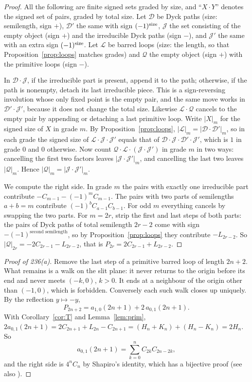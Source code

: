 \documentclass[11pt]{amsart}
\theoremstyle{definition}
\theoremstyle{remark}
\begin{document}
\begin{proof}
All the following are finite signed sets graded by size, and ``$X\cdot Y$'' denotes the signed set of pairs, graded by
total size. Let $\mathcal D$ be Dyck paths (size: semilength, sign $+$), $\mathcal D'$ the same with sign $(-1)^{\rm size}$,
$\mathcal J$ the set consisting of the empty object (sign $+$) and the irreducible Dyck paths (sign $-$), and $\mathcal J'$
the same with an extra sign $(-1)^{\rm size}$. Let $\mathcal L$ be barred loops (size: the length, so that Proposition~\ref{prop:loops} matches grades) and $\mathcal Q$
the empty object (sign $+$) with the primitive loops (sign $-$).

In $\mathcal D\cdot\mathcal J$, if the irreducible part is present, append it to the path; otherwise, if the path is
nonempty, detach its last irreducible piece. This is a sign-reversing involution whose only fixed point is the empty pair,
and the same move works in $\mathcal D'\cdot\mathcal J'$, because it does not change the total size. Likewise
$\mathcal L\cdot\mathcal Q$ cancels to the empty pair by appending or detaching a last primitive loop. Write $|X|_m$ for
the signed size of $X$ in grade $m$. By Proposition~\ref{prop:loops}, $|\mathcal L|_m=|\mathcal D\cdot\mathcal D'|_m$, so
in each grade the signed size of $\mathcal L\cdot\mathcal J\cdot\mathcal J'$ equals that of
$\mathcal D\cdot\mathcal J\cdot\mathcal D'\cdot\mathcal J'$, which is $1$ in grade $0$ and $0$ otherwise. Now count
$\mathcal Q\cdot\mathcal L\cdot(\mathcal J\cdot\mathcal J')$ in grade $m$ in two ways: cancelling the first two factors
leaves $|\mathcal J\cdot\mathcal J'|_m$, and cancelling the last two leaves $|\mathcal Q|_m$. Hence
$|\mathcal Q|_m=|\mathcal J\cdot\mathcal J'|_m$.

We compute the right side. In grade $m$ the pairs with exactly one irreducible part contribute $-C_{m-1}-(-1)^mC_{m-1}$.
The pairs with two parts of semilengths $a+b=m$ contribute $(-1)^bC_{a-1}C_{b-1}$. For odd $m$ everything cancels by
swapping the two parts. For $m=2r$, strip the first and last steps of both parts: the pairs of Dyck paths of total
semilength $2r-2$ come with sign $-(-1)^{\text{second semilength}}$, so by Proposition~\ref{prop:loops} they contribute
$-L_{2r-2}$. So $|\mathcal Q|_{2r}=-2C_{2r-1}-L_{2r-2}$, that is $P_{2r}=2C_{2r-1}+L_{2r-2}$.
\end{proof}

\begin{proof}[Proof of 236(a)]
Remove the last step of a primitive barred loop of length $2n+2$. What remains is a walk on the slit plane: it never
returns to the origin before its end and never meets $(-k,0)$, $k>0$. It ends at a neighbour of the origin other than
$(-1,0)$, which is forbidden. Conversely each such walk closes up uniquely. By the reflection $y\mapsto-y$,
\[
  P_{2n+2}=a_{1,0}(2n+1)+2\,a_{0,1}(2n+1).
\]
With Corollary~\ref{cor:T} and Lemma~\ref{lem:prim},
$2a_{0,1}(2n+1)=2C_{2n+1}+L_{2n}-C_{2n+1}=(H_n+K_n)+(H_n-K_n)=2H_n$. So
\[
  a_{0,1}(2n+1)=\sum_{k=0}^nC_{2k}C_{2n-2k},
\]
and the right side is $4^nC_n$ by Shapiro's identity, which has a bijective proof \cite{HN} (see also \cite{N}).
\end{proof}
\end{document}
